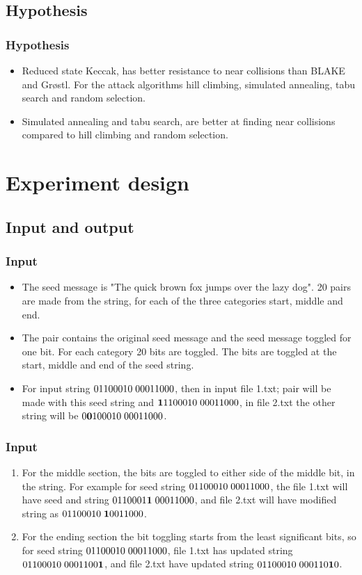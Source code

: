 \documentclass{beamer}
\begin{document}
\subsection{Hypothesis}

\begin{frame}
\frametitle{Hypothesis}
\begin{itemize}
\item Reduced state Keccak, has better resistance to near collisions than BLAKE and Gr{\o}stl. For 
the attack algorithms hill climbing, simulated annealing, tabu search and random selection.
\item Simulated annealing and tabu search, are better at finding near collisions compared to hill 
climbing and random selection.      
\end{itemize}
\end{frame}

\section{Experiment design}

\subsection{Input and output}

\begin{frame}
\frametitle{Input}
\begin{itemize}
\item The seed message is "The quick brown fox jumps over the lazy dog". 20 pairs are made from the
string, for each of the three categories start, middle and end.
\item The pair contains the original seed message and the seed message toggled for one bit. For each
category 20 bits are toggled. The bits are toggled at the start, middle and end of the seed string.
\item For input string $01100010\thickspace00011000$, then in input file 1.txt; pair will be made with this seed
string and ${\bf 1}1100010\thickspace00011000$, in file 2.txt the other  string will be 
$0{\bf 0}100010\thickspace00011000$.
\end{itemize}
\end{frame}

\begin{frame}
\frametitle{Input}
\begin{enumerate}
\item For the middle section, the bits are toggled to either side of the middle bit, in the string. For example
for seed string $01100010\thickspace00011000$, the file 1.txt will have seed and string 
$0110001{\bf 1}\thickspace00011000$, and file 2.txt will have modified string as 
$01100010\thickspace{\bf 1}0011000$.
\item For the ending section the bit toggling starts from the least significant bits, so for seed string
$01100010\thickspace00011000$, file 1.txt has updated string $01100010\thickspace0001100{\bf 1}$, and 
file 2.txt have updated string $01100010\thickspace000110{\bf 1}0$.
\end{enumerate}
\end{frame}
\end{document}
